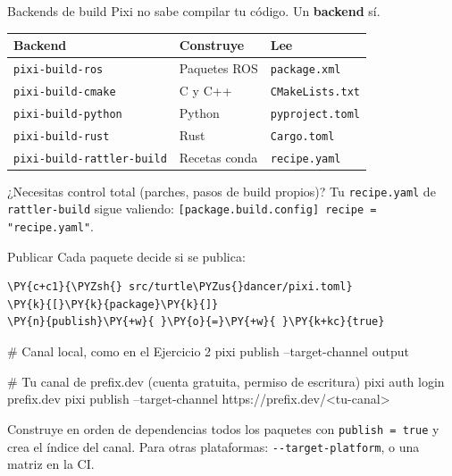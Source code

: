 \documentclass[aspectratio=169]{beamer}
\begin{document}
\begin{frame}{Backends de build}
Pixi no sabe compilar tu código. Un \textbf{backend} sí.
\vfill
\centering
\begin{tabular}{lll}
\toprule
\textbf{Backend} & \textbf{Construye} & \textbf{Lee} \\
\midrule
\texttt{pixi-build-ros} & Paquetes ROS & \lstinline|package.xml| \\
\texttt{pixi-build-cmake} & C y C++ & \lstinline|CMakeLists.txt| \\
\texttt{pixi-build-python} & Python & \lstinline|pyproject.toml| \\
\texttt{pixi-build-rust} & Rust & \lstinline|Cargo.toml| \\
\texttt{pixi-build-rattler-build} & Recetas conda & \lstinline|recipe.yaml| \\
\bottomrule
\end{tabular}
\vfill
\raggedright \small ¿Necesitas control total (parches, pasos de build propios)? Tu \lstinline|recipe.yaml| de \texttt{rattler-build} sigue valiendo: \lstinline|[package.build.config] recipe = "recipe.yaml"|.
\end{frame}

\begin{frame}[fragile]{Publicar}
Cada paquete decide si se publica:
\begin{filelisting}
\begin{Verbatim}[commandchars=\\\{\},breaklines,breakanywhere]
\PY{c+c1}{\PYZsh{} src/turtle\PYZus{}dancer/pixi.toml}
\PY{k}{[}\PY{k}{package}\PY{k}{]}
\PY{n}{publish}\PY{+w}{ }\PY{o}{=}\PY{+w}{ }\PY{k+kc}{true}
\end{Verbatim}
\end{filelisting}
\begin{terminal}
# Canal local, como en el Ejercicio 2
pixi publish --target-channel output

# Tu canal de prefix.dev (cuenta gratuita, permiso de escritura)
pixi auth login prefix.dev
pixi publish --target-channel https://prefix.dev/<tu-canal>
\end{terminal}
\vfill
\small Construye en orden de dependencias todos los paquetes con \lstinline|publish = true| y crea el índice del canal. Para otras plataformas: \lstinline|--target-platform|, o una matriz en la CI.
\end{frame}
\end{document}
